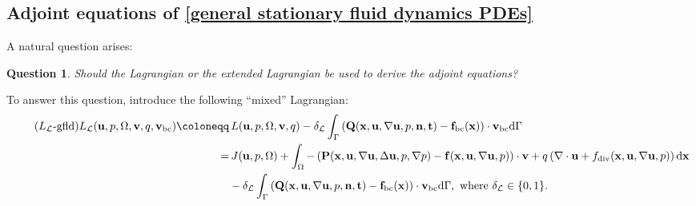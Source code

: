 \documentclass[oneside,11pt]{book}
\numberwithin{equation}{section}
\newtheorem{question}{Question}[section]
\begin{document}
\subsection{Adjoint equations of \eqref{general stationary fluid dynamics PDEs}}
A natural question arises:
\begin{question}
    Should the Lagrangian or the extended Lagrangian be used to derive the adjoint equations?
\end{question}
To answer this question, introduce the following ``mixed'' Lagrangian:
\begin{align}
    \label{mixed Lagrangian for general stationary fluid dynamics PDEs}
    \tag{$L_{\mathcal{L}}$-gfld}
    L_{\mathcal{L}}({\bf u},p,\Omega,{\bf v},q,{\bf v}_{\rm bc})\coloneqq&\, L({\bf u},p,\Omega,{\bf v},q)
    - \delta_{\mathcal{L}}\int_\Gamma \left({\bf Q}({\bf x},{\bf u},\nabla{\bf u},p,{\bf n},{\bf t}) - {\bf f}_{\rm bc}({\bf x})\right)\cdot{\bf v}_{\rm bc}{\rm d}\Gamma\\
    =&\, J({\bf u},p,\Omega) + \int_\Omega -\left({\bf P}({\bf x},{\bf u},\nabla{\bf u},\Delta{\bf u},p,\nabla p) - {\bf f}({\bf x},{\bf u},\nabla{\bf u},p)\right)\cdot{\bf v} + q\left(\nabla\cdot{\bf u} + f_{\rm div}({\bf x},{\bf u},\nabla{\bf u},p)\right){\rm d}{\bf x}\nonumber\\
    &- \delta_{\mathcal{L}}\int_\Gamma \left({\bf Q}({\bf x},{\bf u},\nabla{\bf u},p,{\bf n},{\bf t}) - {\bf f}_{\rm bc}({\bf x})\right)\cdot{\bf v}_{\rm bc}{\rm d}\Gamma, \mbox{ where } \delta_{\mathcal{L}}\in\{0,1\}\nonumber.
\end{align}
\end{document}
